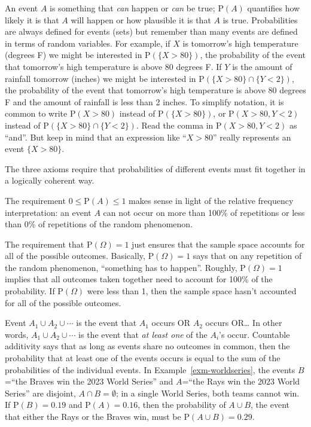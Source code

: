 \documentclass[
  letterpaper,
  DIV=11,
  numbers=noendperiod]{scrreprt}
\theoremstyle{plain}
\theoremstyle{definition}
\theoremstyle{definition}
\theoremstyle{definition}
\theoremstyle{remark}
\begin{document}
An event \(A\) is something that \emph{can} happen or \emph{can} be
true; \(\textrm{P}(A)\) quantifies how likely it is that \(A\) will
happen or how plausible it is that \(A\) is true. Probabilities are
always defined for events (sets) but remember than many events are
defined in terms of random variables. For example, if \(X\) is
tomorrow's high temperature (degrees F) we might be interested in
\(\textrm{P}(\{X>80\})\), the probability of the event that tomorrow's
high temperature is above 80 degrees F. If \(Y\) is the amount of
rainfall tomorrow (inches) we might be interested in
\(\textrm{P}(\{X > 80\}\cap \{Y < 2\})\), the probability of the event
that tomorrow's high temperature is above 80 degrees F and the amount of
rainfall is less than 2 inches. To simplify notation, it is common to
write \(\textrm{P}(X>80)\) instead of \(\textrm{P}(\{X>80\})\), or
\(\textrm{P}(X > 80, Y < 2)\) instead of
\(\textrm{P}(\{X > 80\}\cap \{Y < 2\})\). Read the comma in
\(\textrm{P}(X > 80, Y < 2)\) as ``and''. But keep in mind that an
expression like ``\(X>80\)'' really represents an event \(\{X>80\}\).

The three axioms require that probabilities of different events must fit
together in a logically coherent way.

The requirement \(0\le \textrm{P}(A)\le 1\) makes sense in light of the
relative frequency interpretation: an event \(A\) can not occur on more
than 100\% of repetitions or less than 0\% of repetitions of the random
phenomenon.

The requirement that \(\textrm{P}(\Omega)=1\) just ensures that the
sample space accounts for all of the possible outcomes. Basically,
\(\textrm{P}(\Omega)=1\) says that on any repetition of the random
phenomenon, ``something has to happen''. Roughly,
\(\textrm{P}(\Omega)=1\) implies that all outcomes taken together need
to account for 100\% of the probability. If \(\textrm{P}(\Omega)\) were
less than 1, then the sample space hasn't accounted for all of the
possible outcomes.

Event \(A_1 \cup A_2 \cup \cdots\) is the event that \(A_1\) occurs OR
\(A_2\) occurs OR\ldots{} In other words, \(A_1 \cup A_2 \cup \cdots\)
is the event that \emph{at least one} of the \(A_i\)'s occur. Countable
additivity says that as long as events share no outcomes in common, then
the probability that at least one of the events occurs is equal to the
sum of the probabilities of the individual events. In
Example~\ref{exm-worldseries}, the events \(B\)=``the Braves win the
2023 World Series'' and \(A\)=``the Rays win the 2023 World Series'' are
disjoint, \(A\cap B = \emptyset\); in a single World Series, both teams
cannot win. If \(\textrm{P}(B) = 0.19\) and \(\textrm{P}(A) = 0.16\),
then the probability of \(A\cup B\), the event that either the Rays or
the Braves win, must be \(\textrm{P}(A\cup B)=0.29\).
\end{document}
